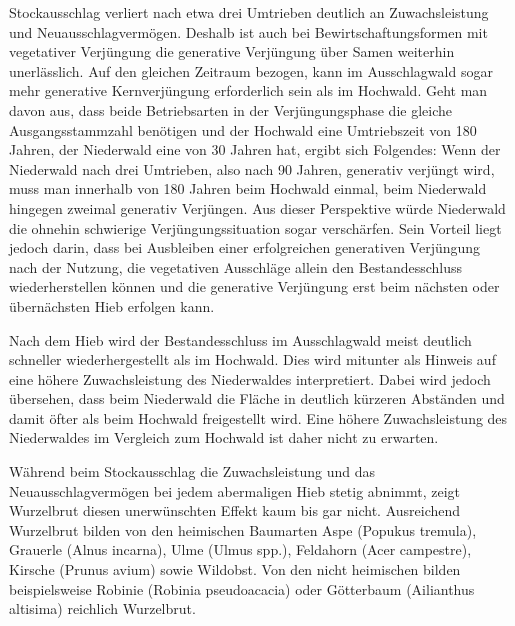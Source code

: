 \documentclass[twocolumn]{scrartcl}
\begin{document}
Stockausschlag verliert nach etwa drei Umtrieben deutlich an Zuwachsleistung und
Neuausschlagvermögen. Deshalb ist auch bei Bewirtschaftungsformen mit
vegetativer Verjüngung die generative Verjüngung über Samen weiterhin
unerlässlich. Auf den gleichen Zeitraum bezogen, kann im Ausschlagwald sogar
mehr generative Kernverjüngung erforderlich sein als im Hochwald. Geht man davon
aus, dass beide Betriebsarten in der Verjüngungsphase die gleiche
Ausgangsstammzahl benötigen und der Hochwald eine Umtriebszeit von 180 Jahren,
der Niederwald eine von 30 Jahren hat, ergibt sich Folgendes: Wenn der
Niederwald nach drei Umtrieben, also nach 90 Jahren, generativ verjüngt wird,
muss man innerhalb von 180 Jahren beim Hochwald einmal, beim Niederwald hingegen
zweimal generativ Verjüngen. Aus dieser Perspektive würde Niederwald die ohnehin
schwierige Verjüngungssituation sogar verschärfen. Sein Vorteil liegt jedoch
darin, dass bei Ausbleiben einer erfolgreichen generativen Verjüngung nach der
Nutzung, die vegetativen Ausschläge allein den Bestandesschluss wiederherstellen
können und die generative Verjüngung erst beim nächsten oder übernächsten Hieb
erfolgen kann.

Nach dem Hieb wird der Bestandesschluss im Ausschlagwald meist deutlich
schneller wiederhergestellt als im Hochwald. Dies wird mitunter als Hinweis auf
eine höhere Zuwachsleistung des Niederwaldes interpretiert. Dabei wird jedoch
übersehen, dass beim Niederwald die Fläche in deutlich kürzeren Abständen und
damit öfter als beim Hochwald freigestellt wird. Eine höhere Zuwachsleistung des
Niederwaldes im Vergleich zum Hochwald ist daher nicht zu erwarten.

Während beim Stockausschlag die Zuwachsleistung und das Neuausschlagvermögen bei
jedem abermaligen Hieb stetig abnimmt, zeigt Wurzelbrut diesen unerwünschten
Effekt kaum bis gar nicht. Ausreichend Wurzelbrut bilden von den heimischen
Baumarten Aspe (Popukus tremula), Grauerle (Alnus incarna), Ulme (Ulmus spp.),
Feldahorn (Acer campestre), Kirsche (Prunus avium) sowie Wildobst. Von den nicht
heimischen bilden beispielsweise Robinie (Robinia pseudoacacia) oder Götterbaum
(Ailianthus altisima) reichlich Wurzelbrut.
\end{document}
